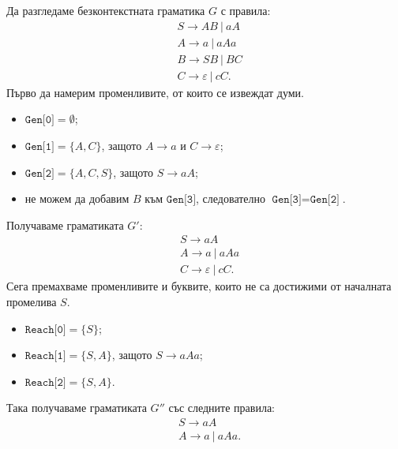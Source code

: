 \begin{extra2}
  \begin{example}
    Да разгледаме безконтекстната граматика $G$ с правила:
    \begin{align*}
      & S \to AB\ |\ aA\\
      & A \to a\ |\ aAa\\
      & B \to SB\ |\ BC\\
      & C \to \varepsilon\ |\ cC.
    \end{align*}
    Първо да намерим променливите, от които се извеждат думи.
    \begin{itemize}
    \item
      $\texttt{Gen[0]} = \emptyset$;
    \item 
      $\texttt{Gen[1]} = \{A, C\}$, защото $A \to a$ и $C \to \varepsilon$;
    \item
      $\texttt{Gen[2]} = \{A, C, S\}$, защото $S \to aA$;
    \item
      не можем да добавим $B$ към $\texttt{Gen[3]}$, следователно $\texttt{Gen[3]} = \texttt{Gen[2]}$.
    \end{itemize}
    Получаваме граматиката $G'$:
    \begin{align*}
      & S \to aA\\
      & A \to a\ |\ aAa\\
      & C \to \varepsilon\ |\ cC.
    \end{align*}
    Сега премахваме променливите и буквите, които не са достижими от началната промелива $S$.
    \begin{itemize}
    \item
      $\texttt{Reach[0]} = \{S\}$;
    \item
      $\texttt{Reach[1]} = \{S,A\}$, защото $S \to aAa$;
    \item
      $\texttt{Reach[2]} = \{S,A\}$.
    \end{itemize}
    Така получаваме граматиката $G''$ със следните правила:
    \begin{align*}
      & S \to aA\\
      & A \to a\ |\ aAa.
    \end{align*}
  \end{example}
\end{extra2}

